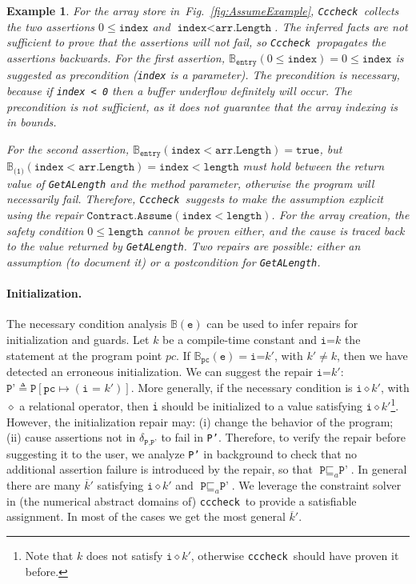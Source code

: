 \documentclass[10pt]{sigplanconf}
\newtheorem{example}{Example}
\newcommand{\refFig}[1]{Fig.~\ref{fig:#1}}
\newcommand{\code}[1]{\texttt{#1}}
\newcommand{\clousot}{\code{cccheck}}
\newcommand{\Clousot}{\code{Cccheck}}
\newcommand{\diff}[2]{\delta_{\code{#1}, \code{#2}}}
\begin{document}
\begin{example}\normalfont
For the array store in~\refFig{AssumeExample}, \Clousot\ collects the
two assertions $0 \leq \code{index}$ and $\code{index} <
\code{arr.Length}$. The inferred facts are not sufficient to prove that
the assertions will not fail, so \Clousot\ propagates the assertions
backwards.  For the first assertion, $\mathbb{B}_\code{entry}(0 \leq
\code{index}) = 0
\leq \code{index}$ is suggested as precondition (\code{index} is a
parameter). The precondition is necessary, because if \code{index < 0}
then a buffer underflow definitely will occur. The precondition is not
sufficient, as it does not guarantee that the array indexing is in
bounds.

For the second assertion, $\mathbb{B}_\code{entry}(\code{index} <
\code{arr.Length}) = \code{true}$, but $\mathbb{B}_\code{(1)}(\code{index} <
\code{arr.Length}) = \code{index} < \code{length}$ must hold between the 
return value of \code{GetALength} and the method parameter, otherwise
the program will necessarily fail.  Therefore, \Clousot\ suggests to
make the assumption explicit using the repair
$\code{Contract.}\allowbreak\code{Assume}\allowbreak(\code{index} < \code{length})$.  For the array
creation, the safety condition $0 \leq \code{length}$ cannot be proven
either, and the cause is traced back to the value returned by
\code{GetALength}.  Two repairs are possible: either an assumption (to
document it) or a postcondition for \code{GetALength}. 
\end{example}

\paragraph{Initialization.}
The necessary condition analysis $\mathbb{B}(\code{e})$ can be used to
infer repairs for initialization and guards.  Let $k$ be a
compile-time constant and $\code{i=} k$ the statement at the program
point $pc$.  If $\mathbb{B}_\code{pc}(\code{e}) = \code{i=} k' $, with
$k' \neq k$, then we have detected an erroneous initialization.  We
can suggest the repair $\code{i=} k'$: $\code{P'} \triangleq
\code{P}[\code{pc} \mapsto (\code{i = } k')]$.  More generally, if
the necessary condition is $\code{i} \diamond k'$, with $\diamond$ a
relational operator, then \code{i} should be initialized to a value
satisfying $\code{i} \diamond k'$\footnote{Note that $k$ does not
satisfy $\code{i} \diamond k'$, otherwise \clousot\ should have proven
it before.}.  
However, the initialization repair may: (i) change the
behavior of the program; (ii) cause assertions not in $\diff{P}{P'}$
to fail in \code{P'}.  Therefore, to verify the repair before
suggesting it to the user, we analyze \code{P'} in background to check
that no additional assertion failure is introduced by the repair,
so that $\code{P} \sqsubseteq_a \code{P'}$.
In general there are many $\overline{k}'$ satisfying $\code{i} \diamond k'$ and  $\code{P} \sqsubseteq_a \code{P'}$.
We leverage the constraint solver in (the numerical abstract domains of) \clousot\ to provide a satisfiable assignment.
In most of the cases we get the most general  $\overline{k}'$.
\end{document}
